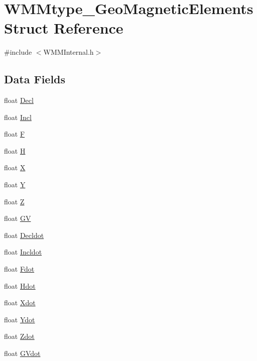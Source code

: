 \hypertarget{struct_w_m_mtype___geo_magnetic_elements}{\section{W\-M\-Mtype\-\_\-\-Geo\-Magnetic\-Elements Struct Reference}
\label{struct_w_m_mtype___geo_magnetic_elements}
}


{\ttfamily \#include $<$W\-M\-M\-Internal.\-h$>$}

\subsection*{Data Fields}
\begin{DoxyCompactItemize}
\item 
float \hyperlink{struct_w_m_mtype___geo_magnetic_elements_a9a93785970d529cbca6172d59ca0d225}{Decl}
\item 
float \hyperlink{struct_w_m_mtype___geo_magnetic_elements_a7457bb44f79e87703e2c83bab3c71ae9}{Incl}
\item 
float \hyperlink{struct_w_m_mtype___geo_magnetic_elements_af97c7b8926ffd4d694c4292916c2c153}{F}
\item 
float \hyperlink{struct_w_m_mtype___geo_magnetic_elements_ae3c575b310c43b133f83cf6bd3b14cfe}{H}
\item 
float \hyperlink{struct_w_m_mtype___geo_magnetic_elements_af81004bb2f8cd436246b1b4240d1acc9}{X}
\item 
float \hyperlink{struct_w_m_mtype___geo_magnetic_elements_af6f78344def47740cd5ce0196189ce32}{Y}
\item 
float \hyperlink{struct_w_m_mtype___geo_magnetic_elements_adb133f24b128e0dcd3ad2b219d2c42e5}{Z}
\item 
float \hyperlink{struct_w_m_mtype___geo_magnetic_elements_aa1d50824f5887167ee93d075222f9deb}{G\-V}
\item 
float \hyperlink{struct_w_m_mtype___geo_magnetic_elements_a6c23bd42050e02810a937cd0316b9d8e}{Decldot}
\item 
float \hyperlink{struct_w_m_mtype___geo_magnetic_elements_aac0feb3987db9841acd278f27f0726c7}{Incldot}
\item 
float \hyperlink{struct_w_m_mtype___geo_magnetic_elements_aaff92c0324d3a717abc215245cbd5238}{Fdot}
\item 
float \hyperlink{struct_w_m_mtype___geo_magnetic_elements_aa1e42deb6458e019df1619c0fec2ba3c}{Hdot}
\item 
float \hyperlink{struct_w_m_mtype___geo_magnetic_elements_a58fb30f1b03a7cace00a55fb28f6752f}{Xdot}
\item 
float \hyperlink{struct_w_m_mtype___geo_magnetic_elements_a2290a6a91702f831acd13dc8433c816a}{Ydot}
\item 
float \hyperlink{struct_w_m_mtype___geo_magnetic_elements_a094afb05e04f6d9654a1a469987600a6}{Zdot}
\item 
float \hyperlink{struct_w_m_mtype___geo_magnetic_elements_ab653a08b7f24f25dd253ff9f16f3b01e}{G\-Vdot}
\end{DoxyCompactItemize}



